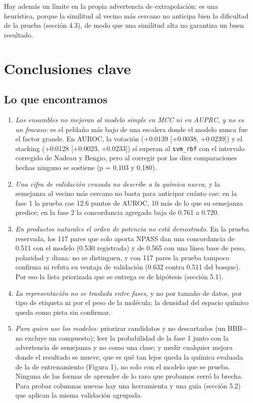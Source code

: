 \documentclass[letterpaper,11pt]{article}
\providecommand{\tightlist}{\setlength{\itemsep}{0pt}\setlength{\parskip}{0pt}}
\begin{document}
Hay además un límite en la propia advertencia de extrapolación: es una heurística, porque la similitud al vecino más cercano no anticipa bien la dificultad de la prueba (sección 4.3), de modo que una similitud alta no garantiza un buen resultado.

\section{Conclusiones clave}
\subsection{Lo que encontramos}

\begin{enumerate}
\def\labelenumi{\arabic{enumi}.}
\tightlist
\item
  \emph{Los ensambles no mejoran al modelo simple en MCC ni en AUPRC, y no es un fracaso:} es el peldaño más bajo de una escalera donde el modelo nunca fue el factor grande. En AUROC, la votación (+0.0139 {[}+0.0038, +0.0239{]}) y el stacking (+0.0128 {[}+0.0023, +0.0233{]}) sí superan al \texttt{svm\_rbf} con el intervalo corregido de Nadeau y Bengio, pero al corregir por las diez comparaciones hechas ninguno se sostiene (p = 0.103 y 0.180).
\item
  \emph{Una cifra de validación cruzada no describe a la química nueva,} y la semejanza al vecino más cercano no basta para anticipar cuánto cae: en la fase 1 la prueba cae 12.6 puntos de AUROC, 10 más de lo que su semejanza predice; en la fase 2 la concordancia agregada baja de 0.761 a 0.720.
\item
  \emph{En productos naturales el orden de potencia no está demostrado.} En la prueba reservada, los 117 pares que solo aporta NPASS dan una concordancia de 0.511 con el modelo (0.530 registrada) y de 0.565 con una línea base de peso, polaridad y diana: no se distinguen, y con 117 pares la prueba tampoco confirma ni refuta su ventaja de validación (0.632 contra 0.511 del bosque). Por eso la lista priorizada que se entrega es de hipótesis (sección 5.1).
\item
  \emph{La representación no se traslada entre fases,} y no por tamaño de datos, por tipo de etiqueta ni por el peso de la molécula; la densidad del espacio químico queda como pista sin confirmar.
\item
  \emph{Para quien use los modelos:} priorizar candidatos y no descartarlos (un BBB− no excluye un compuesto); leer la probabilidad de la fase 1 junto con la advertencia de semejanza y no como una clase; y medir cualquier mejora donde el resultado se mueve, que es qué tan lejos queda la química evaluada de la de entrenamiento (Figura 1), no solo con el modelo que se prueba. Ninguna de las formas de aprender de lo raro que probamos cerró la brecha. Para probar columnas nuevas hay una herramienta y una guía (sección 5.2) que aplican la misma validación agrupada.
\end{enumerate}
\end{document}
